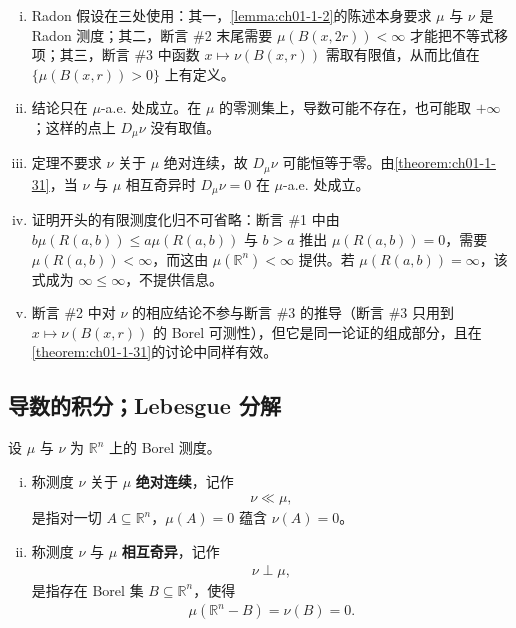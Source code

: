 \documentclass[../../main.tex]{subfiles}%
\begin{document}
\begin{remark}\label{remark:ch01-thm-1-29-条件}
\begin{enumerate}[(i)]
\item Radon 假设在三处使用：其一，\cref{lemma:ch01-1-2}的陈述本身要求 $\mu$ 与 $\nu$ 是 Radon 测度；其二，断言 \#2 末尾需要 $\mu(B(x,2r))<\infty$ 才能把不等式移项；其三，断言 \#3 中函数 $x\mapsto\nu(B(x,r))$ 需取有限值，从而比值在 $\{\mu(B(x,r))>0\}$ 上有定义。%
\item 结论只在 $\mu$-a.e. 处成立。在 $\mu$ 的零测集上，导数可能不存在，也可能取 $+\infty$；这样的点上 $D_{\mu}\nu$ 没有取值。
\item 定理不要求 $\nu$ 关于 $\mu$ 绝对连续，故 $D_{\mu}\nu$ 可能恒等于零。由\cref{theorem:ch01-1-31}，当 $\nu$ 与 $\mu$ 相互奇异时 $D_{\mu}\nu=0$ 在 $\mu$-a.e. 处成立。%
\item 证明开头的有限测度化归不可省略：断言 \#1 中由 $b\mu(R(a,b))\leqslant a\mu(R(a,b))$ 与 $b>a$ 推出 $\mu(R(a,b))=0$，需要 $\mu(R(a,b))<\infty$，而这由 $\mu(\mathbb{R}^n)<\infty$ 提供。若 $\mu(R(a,b))=\infty$，该式成为 $\infty\leqslant\infty$，不提供信息。
\item 断言 \#2 中对 $\nu$ 的相应结论不参与断言 \#3 的推导（断言 \#3 只用到 $x\mapsto\nu(B(x,r))$ 的 Borel 可测性），但它是同一论证的组成部分，且在\cref{theorem:ch01-1-31}的讨论中同样有效。%
\end{enumerate}
\end{remark}

\subsection{导数的积分；Lebesgue 分解}\label{subsection:ch01-06-2}

\begin{definition}[绝对连续与相互奇异]\label{definition:ch01-1-22}
设 $\mu$ 与 $\nu$ 为 $\mathbb{R}^n$ 上的 Borel 测度。
\begin{enumerate}[(i)]
\item 称测度 $\nu$ 关于 $\mu$ \textbf{绝对连续}，记作
\begin{align*}
\nu\ll\mu,
\end{align*}
是指对一切 $A\subseteq\mathbb{R}^n$，$\mu(A)=0$ 蕴含 $\nu(A)=0$。
\item 称测度 $\nu$ 与 $\mu$ \textbf{相互奇异}，记作
\begin{align*}
\nu\perp\mu,
\end{align*}
是指存在 Borel 集 $B\subseteq\mathbb{R}^n$，使得
\begin{align*}
\mu(\mathbb{R}^n-B)=\nu(B)=0.
\end{align*}
\end{enumerate}
\end{definition}
\end{document}
